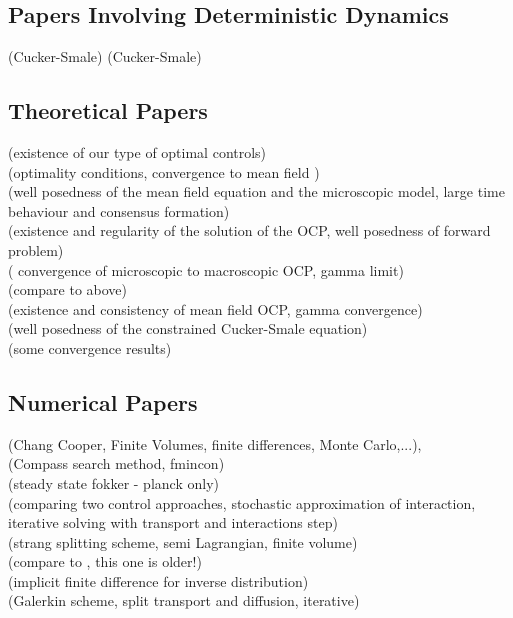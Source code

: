 \documentclass[11pt, a4paper]{article}
\theoremstyle{definition}
\begin{document}
\subsection*{Papers Involving Deterministic Dynamics}
\cite{albi2016no2}
\cite{albi2016selective} (Cucker-Smale)
\cite{Fornasier_2014}
\cite{Fornasier_2014no2}
\cite{fornasier_lisini_orrieri_savare_2019}
\cite{piccoli2014no1} (Cucker-Smale)


\subsection*{Theoretical Papers}
\cite{albi2016mean} (existence of our type of optimal controls)\\
\cite{burger2019meanfield} (optimality conditions, convergence to mean field )\\

\cite{carrillo2018no1} (well posedness of the mean field equation and the microscopic model, large time behaviour and consensus formation)\\
\cite{carrillo2019mean} (existence and regularity of the solution of the OCP, well posedness of forward problem)\\
\cite{Fornasier_2014}( convergence of microscopic to macroscopic OCP, gamma limit)\\
\cite{Fornasier_2014no2} (compare to above)\\
\cite{fornasier_lisini_orrieri_savare_2019} (existence and consistency of mean field OCP, gamma convergence)\\
\cite{piccoli2014no1} (well posedness of the constrained Cucker-Smale equation)\\
\cite{Pinnau_2017} (some convergence results)

\subsection*{Numerical Papers}
\cite{albi2016mean} (Chang Cooper, Finite Volumes, finite differences, Monte Carlo,...),\\
\cite{albi2016no2} (Compass search method, fmincon)\\
\cite{albi2014kinetic} (steady state fokker - planck only)\\
\cite{albi2016selective} (comparing two control approaches, stochastic approximation of interaction, iterative solving with transport and interactions step)\\
\cite{burger2019instantaneous} (strang splitting scheme, semi Lagrangian, finite volume)\\
\cite{burger2016controlling} (compare to \cite{burger2019instantaneous}, this one is older!)\\
\cite{carrillo2018no1}  (implicit finite difference for inverse distribution)\\
\cite{Pinnau_2017} (Galerkin scheme, split transport and diffusion, iterative)
\end{document}
